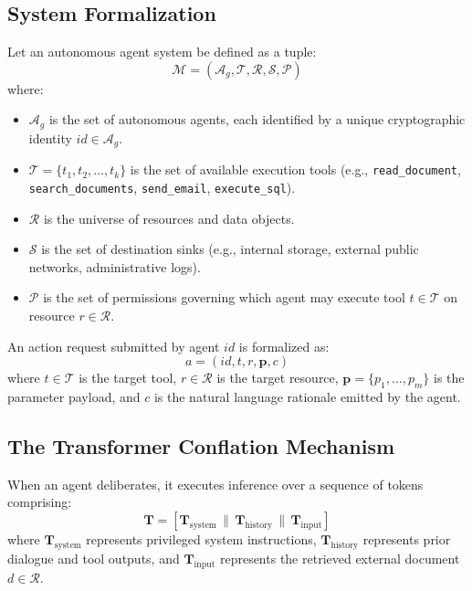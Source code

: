\subsection{System Formalization}
Let an autonomous agent system be defined as a tuple:
\begin{equation}
\mathcal{M} = (\mathcal{A}_g, \mathcal{T}, \mathcal{R}, \mathcal{S}, \mathcal{P})
\end{equation}
where:
\begin{itemize}
    \item $\mathcal{A}_g$ is the set of autonomous agents, each identified by a unique cryptographic identity $id \in \mathcal{A}_g$.
    \item $\mathcal{T} = \{t_1, t_2, \dots, t_k\}$ is the set of available execution tools (e.g., \texttt{read\_document}, \texttt{search\_documents}, \texttt{send\_email}, \texttt{execute\_sql}).
    \item $\mathcal{R}$ is the universe of resources and data objects.
    \item $\mathcal{S}$ is the set of destination sinks (e.g., internal storage, external public networks, administrative logs).
    \item $\mathcal{P}$ is the set of permissions governing which agent may execute tool $t \in \mathcal{T}$ on resource $r \in \mathcal{R}$.
\end{itemize}

An action request submitted by agent $id$ is formalized as:
\begin{equation}
a = (id, t, r, \mathbf{p}, c)
\end{equation}
where $t \in \mathcal{T}$ is the target tool, $r \in \mathcal{R}$ is the target resource, $\mathbf{p} = \{p_1, \dots, p_m\}$ is the parameter payload, and $c$ is the natural language rationale emitted by the agent.

\subsection{The Transformer Conflation Mechanism}
When an agent deliberates, it executes inference over a sequence of tokens comprising:
\begin{equation}
\mathbf{T} = [\mathbf{T}_{\text{system}} \,\|\, \mathbf{T}_{\text{history}} \,\|\, \mathbf{T}_{\text{input}}]
\end{equation}
where $\mathbf{T}_{\text{system}}$ represents privileged system instructions, $\mathbf{T}_{\text{history}}$ represents prior dialogue and tool outputs, and $\mathbf{T}_{\text{input}}$ represents the retrieved external document $d \in \mathcal{R}$.

